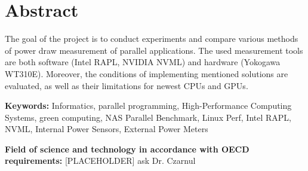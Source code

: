 \chapter*{Abstract}


The goal of the project is to conduct experiments and compare various methods
of power draw measurement of parallel applications. The used measurement
tools are both software (Intel RAPL, NVIDIA NVML) and hardware
(Yokogawa WT310E). Moreover, the conditions of implementing mentioned
solutions are evaluated, as well as their limitations for newest CPUs and GPUs.

\bigskip
\noindent
\textbf{Keywords:} Informatics, parallel programming,
High-Performance Computing Systems, green computing, NAS Parallel Benchmark,
Linux Perf, Intel RAPL, NVML, Internal Power Sensors, External Power Meters

\bigskip
\noindent
\textbf{Field of science and technology in accordance with OECD
requirements:} [PLACEHOLDER] ask Dr. Czarnul

